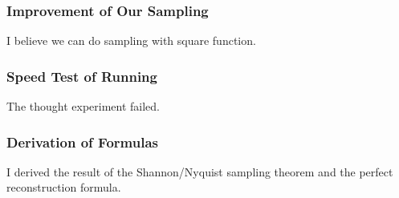 \documentclass{article}
\begin{document}
    \subsubsection*{Improvement of Our Sampling} I believe we can do sampling with square function.
    \subsubsection*{Speed Test of Running} The thought experiment failed.
    \subsubsection*{Derivation of Formulas} I derived the result of the Shannon/Nyquist sampling theorem and the perfect
     reconstruction formula.

% 
% 


\end{document}
